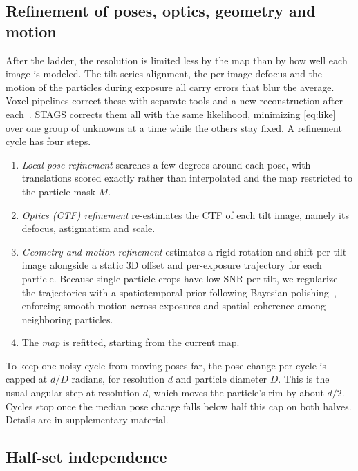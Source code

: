 \subsection{Refinement of poses, optics, geometry and motion}
\label{sec:method:polish}

After the ladder, the resolution is limited less by the map than by how well each image is modeled.
The tilt-series alignment, the per-image defocus and the motion of the particles during exposure all carry errors that blur the average.
Voxel pipelines correct these with separate tools and a new reconstruction after each~\cite{zivanov2019polishing,tegunov2021m}.
STAGS corrects them all with the same likelihood, minimizing \cref{eq:like} over one group of unknowns at a time while the others stay fixed.
A refinement cycle has four steps.
\begin{enumerate}[label=(\roman*),nosep,leftmargin=*]
\item \emph{Local pose refinement} searches a few degrees around each pose, with translations scored exactly rather than interpolated and the map restricted to the particle mask $M$.
\item \emph{Optics (CTF) refinement} re-estimates the CTF of each tilt image, namely its defocus, astigmatism and scale.
\item \emph{Geometry and motion refinement} estimates a rigid rotation and shift per tilt image alongside a static 3D offset and per-exposure trajectory for each particle. Because single-particle crops have low SNR per tilt, we regularize the trajectories with a spatiotemporal prior following Bayesian polishing~\cite{zivanov2019polishing}, enforcing smooth motion across exposures and spatial coherence among neighboring particles.
\item The \emph{map} is refitted, starting from the current map.
\end{enumerate}
To keep one noisy cycle from moving poses far, the pose change per cycle is capped at $d/D$ radians, for resolution $d$ and particle diameter $D$.
This is the usual angular step at resolution $d$, which moves the particle's rim by about $d/2$.
Cycles stop once the median pose change falls below half this cap on both halves.
Details are in supplementary material.%



\subsection{Half-set independence}
\label{sec:method:independence}

